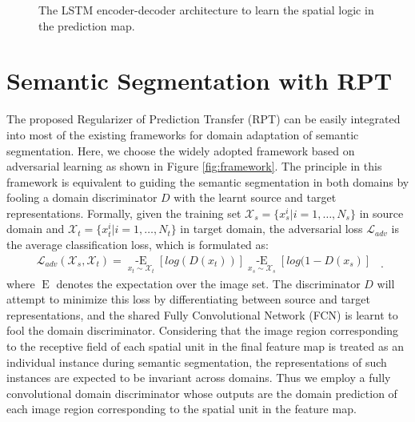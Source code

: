 \documentclass[10pt,twocolumn,letterpaper]{article}
\begin{document}
\begin{figure}[!tb]
   \caption{\small The LSTM encoder-decoder architecture to learn the spatial logic in the prediction map.}
   \label{fig:spatial}
   \vspace{-0.15in}
\end{figure}


\section{Semantic Segmentation with RPT}
The proposed Regularizer of Prediction Transfer (RPT) can be easily integrated into most of the existing frameworks for domain adaptation of semantic segmentation. Here, we choose the widely adopted framework based on adversarial learning as shown in Figure \ref{fig:framework}. The principle in this framework is equivalent to guiding the semantic segmentation in both domains by fooling a domain discriminator $D$ with the learnt source and target representations. Formally, given the training set $\mathcal{X}_{s}=\{x_s^{i}|i=1,\dots,N_s\}$ in source domain and $\mathcal{X}_{t}=\{x_t^{i}|i=1,\dots,N_t\}$ in target domain, the adversarial loss $\mathcal{L}_{adv}$ is the average classification loss, which is formulated as:
\begin{equation}
   \label{eq:adv}
   \begin{aligned}
   \mathcal{L}_{adv}(\mathcal{X}_{s},\mathcal{X}_{t})= \mathop{-E}\limits_{x_t \sim \mathcal{X}_t}[log(D(x_t))]\mathop{-E}\limits_{x_s \sim \mathcal{X}_s}[log(1 - D(x_s)]
   \end{aligned}~~.
\end{equation}
where $\mathop{E}$ denotes the expectation over the image set. The discriminator $D$ will attempt to minimize this loss by differentiating between source and target representations, and the shared Fully Convolutional Network (FCN) is learnt to fool the domain discriminator.
Considering that the image region corresponding to the receptive field of each spatial unit in the final feature map is treated as an individual instance during semantic segmentation, the representations of such instances are expected to be invariant across domains.
Thus we employ a fully convolutional domain discriminator whose outputs are the domain prediction of each image region corresponding to the spatial unit in the feature map.
\end{document}
